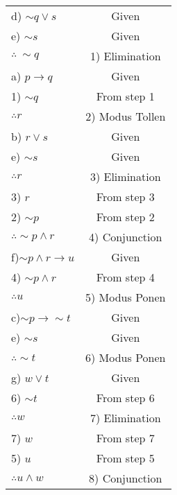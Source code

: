 \documentclass[11pt]{article}
\begin{document}
\begin{flushleft}
\begin{center}
\begin{tabular}{|l|c|}
	d) $\sim q \lor s$	& Given \\ 
	e) $\sim s$			& Given \\ 
   $\therefore \ \sim q$& 1) Elimination \\ \hline
	a) $p \to q$		& Given \\
	1) $\sim q$			& From step 1\\
	 $\therefore r $    & 2) Modus Tollen \\ \hline
	b) $r \lor s$		& Given \\
	e) $\sim s$			& Given \\
	$\therefore r$		& 3) Elimination \\ \hline
	3) $r$				& From step 3 \\
	2) $\sim p$			& From step 2 \\
$\therefore\sim p\land r$&4) Conjunction\\ \hline
	f)$\sim p \land r \to u$& Given \\
	4) $\sim p \land r$	& From step 4 \\
	$\therefore u$		& 5) Modus Ponen \\ \hline
	c)$\sim p \to \sim t$& Given \\
	e) $\sim s$			& Given \\
	$\therefore \sim t$	& 6) Modus Ponen \\ \hline
	g) $w \lor t$		& Given \\
	6) $\sim t$			& From step 6 \\
	$\therefore w$		& 7) Elimination \\ \hline
	7) $w$				& From step 7 \\
	5) $u$				& From step 5 \\ \hline
	$\therefore  u \land w$ & 8) Conjunction \\ \hline
	
	
	\end{tabular}	
	\end{center}
	
	
	
	
	
	
	
	\end{flushleft}
\end{document}
